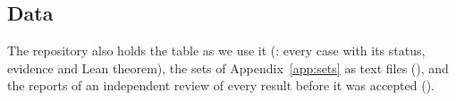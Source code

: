 \subsection*{Data}
The repository also holds the table as we use it (: every case with its
status, evidence and Lean theorem), the sets of Appendix~\ref{app:sets} as text files
(), and the reports of an independent review of every result before it was
accepted ().
